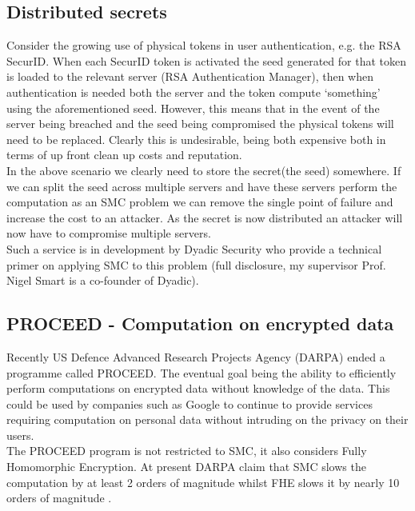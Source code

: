 \documentclass[ %
                    author={Nicholas Tutte},
                supervisor={Prof. Nigel Smart},
                    degree={MEng},
                     title={Secure Two Party Computation},
                  subtitle={A practical comparison of recent protocols},
                      type={Research - GG1K},
                      year={2015} ]{dissertation}
\begin{document}
			\subsection{Distributed secrets} \label{sub2:DistributedSecretApplication}
				Consider the growing use of physical tokens in user authentication, e.g. the RSA SecurID. When each SecurID token is activated the seed generated for that token is loaded to the relevant server (RSA Authentication Manager), then when authentication is needed both the server and the token compute `something' using the aforementioned seed. However, this means that in the event of the server being breached and the seed being compromised the physical tokens will need to be replaced. Clearly this is undesirable, being both expensive both in terms of up front clean up costs and reputation.\\

				In the above scenario we clearly need to store the secret(the seed) somewhere. If we can split the seed across multiple servers and have these servers perform the computation as an SMC problem we can remove the single point of failure and increase the cost to an attacker. As the secret is now distributed an attacker will now have to compromise multiple servers.\\

				Such a service is in development by Dyadic Security who provide a technical primer on applying SMC to this problem \cite{DYADIC_MPC_Primer} (full disclosure, my supervisor Prof. Nigel Smart is a co-founder of Dyadic).

			\subsection{PROCEED - Computation on encrypted data} \label{sub2:PROCEED_DARPA}
				Recently US Defence Advanced Research Projects Agency (DARPA) ended a programme called PROCEED. The eventual goal being the ability to efficiently perform computations on encrypted data without knowledge of the data. This could be used by companies such as Google to continue to provide services requiring computation on personal data without intruding on the privacy on their users.\\

				The PROCEED program is not restricted to SMC, it also considers Fully Homomorphic Encryption. At present DARPA claim that SMC slows the computation by at least 2 orders of magnitude whilst FHE slows it by nearly 10 orders of magnitude \cite{DARPAPROceed}. 
\end{document}
